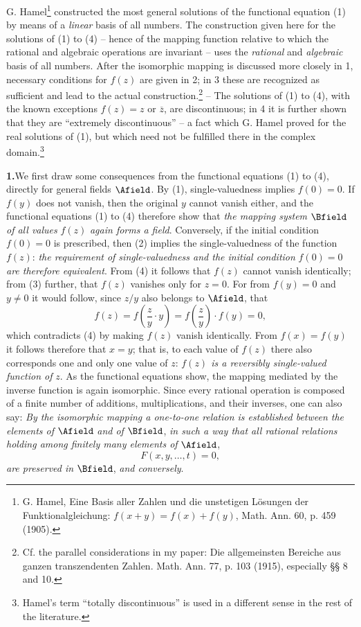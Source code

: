 G. Hamel\footnote{G. Hamel, Eine Basis aller Zahlen und die unstetigen Lösungen der Funktionalgleichung: \(f(x+y)=f(x)+f(y)\), Math. Ann. 60, p. 459 (1905).} constructed the most general solutions of the functional equation (1) by means of a \emph{linear} basis of all numbers. The construction given here for the solutions of (1) to (4) -- hence of the mapping function relative to which the rational and algebraic operations are invariant -- uses the \emph{rational} and \emph{algebraic} basis of all numbers. After the isomorphic mapping is discussed more closely in 1, necessary conditions for \(f(z)\) are given in 2; in 3 these are recognized as sufficient and lead to the actual construction.\footnote{Cf. the parallel considerations in my paper: Die allgemeinsten Bereiche aus ganzen transzendenten Zahlen. Math. Ann. 77, p. 103 (1915), especially §§ 8 and 10.} -- The solutions of (1) to (4), with the known exceptions \(f(z)=z\) or \(\overline z\), are discontinuous; in 4 it is further shown that they are ``extremely discontinuous'' -- a fact which G. Hamel proved for the real solutions of (1), but which need not be fulfilled there in the complex domain.\footnote{Hamel's term ``totally discontinuous'' is used in a different sense in the rest of the literature.}

\medskip
\noindent\textbf{1.}\quad We first draw some consequences from the functional equations (1) to (4), directly for general fields \(\Afield\). By (1), single-valuedness implies \(f(0)=0\). If \(f(y)\) does not vanish, then the original \(y\) cannot vanish either, and the functional equations (1) to (4) therefore show that \emph{the mapping system} \(\Bfield\) \emph{of all values} \(f(z)\) \emph{again forms a field}. Conversely, if the initial condition \(f(0)=0\) is prescribed, then (2) implies the single-valuedness of the function \(f(z)\): \emph{the requirement of single-valuedness and the initial condition} \(f(0)=0\) \emph{are therefore equivalent}. From (4) it follows that \(f(z)\) cannot vanish identically; from (3) further, that \(f(z)\) vanishes only for \(z=0\). For from \(f(y)=0\) and \(y\ne0\) it would follow, since \(z/y\) also belongs to \(\Afield\), that
\[
f(z)=f\!\left(\frac{z}{y}\cdot y\right)=f\!\left(\frac{z}{y}\right)\cdot f(y)=0,
\]
which contradicts (4) by making \(f(z)\) vanish identically. From \(f(x)=f(y)\) it follows therefore that \(x=y\); that is, to each value of \(f(z)\) there also corresponds one and only one value of \(z\): \emph{\(f(z)\) is a reversibly single-valued function of} \(z\). As the functional equations show, the mapping mediated by the inverse function is again isomorphic. Since every rational operation is composed of a finite number of additions, multiplications, and their inverses, one can also say: \emph{By the isomorphic mapping a one-to-one relation is established between the elements of} \(\Afield\) \emph{and of} \(\Bfield\), \emph{in such a way that all rational relations holding among finitely many elements of} \(\Afield\),
\[
F(x,y,\ldots,t)=0,
\]
\emph{are preserved in} \(\Bfield\), \emph{and conversely}.

